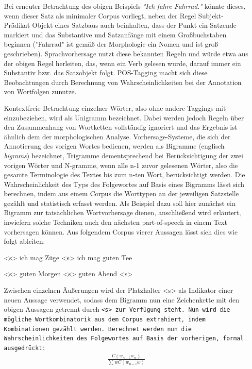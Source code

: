\documentclass[12pt]{report}
\begin{document}
Bei erneuter Betrachtung des obigen Beispiels \textit{"Ich fahre Fahrrad."} könnte dieses, wenn dieser Satz als minimaler Corpus vorliegt, neben der Regel Subjekt-Prädikat-Objekt eines Satzbaus auch beinhalten, dass der Punkt ein Satzende markiert und das Substantive und Satzanfänge mit einem Großbuchstaben beginnen ("Fahrrad" ist gemäß der Morphologie ein Nomen und ist groß geschrieben). Sprachvorhersage nutzt diese bekannten Regeln und würde etwa aus der obigen Regel herleiten, das, wenn ein Verb gelesen wurde, darauf immer ein Substantiv bzw. das Satzobjekt folgt. POS-Tagging macht sich diese Beobachtungen durch Berechnung von Wahrscheinlichkeiten bei der Annotation von Wortfolgen zunutze. 

Kontextfreie Betrachtung einzelner Wörter, also ohne andere Taggings mit einzubeziehen, wird als Unigramm bezeichnet. Dabei werden jedoch Regeln über den Zusammenhang von Wortketten vollständig ignoriert und das Ergebnis ist ähnlich dem der morphologischen Analyse. Vorhersage-Systeme, die sich der Annotierung des vorigen Wortes bedienen, werden als Bigramme (englisch \textit{bigrams}) bezeichnet, Trigramme dementsprechend bei Berücksichtigung der zwei vorigen Wörter und N-gramme, wenn alle n-1 zuvor gelesenen Wörter, also die gesamte Terminologie des Textes bis zum n-ten Wort, berücksichtigt werden.
Die Wahrscheinlichkeit des Typs des Folgewortes auf Basis eines Bigramms lässt sich berechnen, indem aus einem Corpus die Worttypen an der jeweiligen Satzstelle gezählt und statistisch erfasst werden. 
Als Beispiel dazu soll hier zunächst ein Bigramm zur tatsächlichen Wortvorhersage dienen, anschließend wird erläutert, inwiefern solche Techniken auch den nächsten part-of-speech in einem Text vorhersagen können. Aus folgendem Corpus vierer Aussagen lässt sich dies wie folgt ableiten:
\\ \tt

<s> ich mag Züge <s> ich mag guten Tee 


<s> guten Morgen <s> guten Abend <s>
\\ \rm

Zwischen einzelnen Äußerungen wird der Platzhalter <s> als Indikator einer neuen Aussage verwendet, sodass dem Bigramm nun eine Zeichenkette mit den obigen Aussagen getrennt durch \tt <s> \rm zur Verfügung steht. Nun wird die mögliche Wortkombinatorik aus dem Corpus extrahiert, indem Kombinationen gezählt werden. Berechnet werden nun die Wahrscheinlichkeiten des Folgewortes auf Basis der vorherigen, formal ausgedrückt: \begin{align}
\frac{C(w_{n-1} w_{n})}{\sum{w}{}C(w_{n-1}w)}
\end{align}
\end{document}
